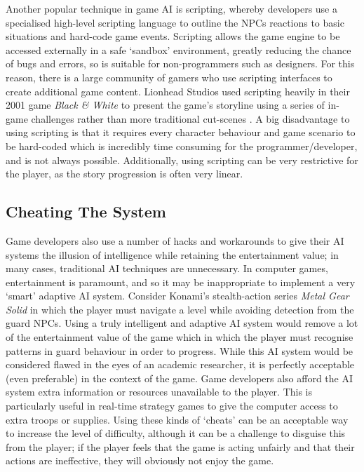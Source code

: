 \documentclass[a4paper,oneside]{report}
\begin{document}
Another popular technique in game AI is scripting, whereby developers use a specialised high-level scripting language to outline the NPCs reactions to basic situations and hard-code game events. Scripting allows the game engine to be accessed externally in a safe `sandbox' environment, greatly reducing the chance of bugs and errors, so is suitable for non-programmers such as designers. For this reason, there is a large community of gamers who use scripting interfaces to create additional game content. Lionhead Studios used scripting heavily in their 2001 game \emph{Black \& White} to present the game's storyline using a series of in-game challenges rather than more traditional cut-scenes \cite{:hc}. A big disadvantage to using scripting is that it requires every character behaviour and game scenario to be hard-coded which is incredibly time consuming for the programmer/developer, and is not always possible. Additionally, using scripting can be very restrictive for the player, as the story progression is often very linear.

\subsection{Cheating The System}

Game developers also use a number of hacks and workarounds to give their AI systems the illusion of intelligence while retaining the entertainment value; in many cases, traditional AI techniques are unnecessary. In computer games, entertainment is paramount, and so it may be inappropriate to implement a very `smart' adaptive AI system. Consider Konami's stealth-action series \emph{Metal Gear Solid} in which the player must navigate a level while avoiding detection from the guard NPCs. Using a truly intelligent and adaptive AI system would remove a lot of the entertainment value of the game which in which the player must recognise patterns in guard behaviour in order to progress. While this AI system would be considered flawed in the eyes of an academic researcher, it is perfectly acceptable (even preferable) in the context of the game. Game developers also afford the AI system extra information or resources unavailable to the player. This is particularly useful in real-time strategy games to give the computer access to extra troops or supplies. Using these kinds of `cheats' can be an acceptable way to increase the level of difficulty, although it can be a challenge to disguise this from the player; if the player feels that the game is acting unfairly and that their actions are ineffective, they will obviously not enjoy the game.
\end{document}
